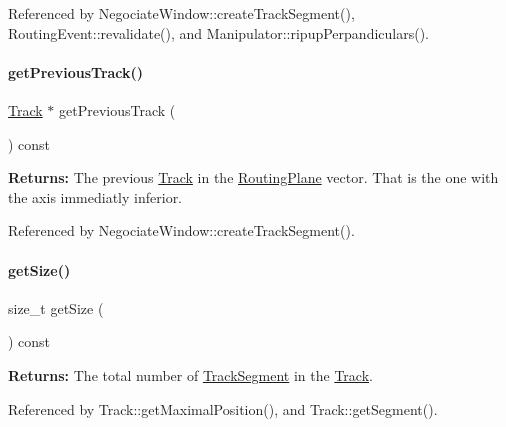 Referenced by Negociate\+Window\+::create\+Track\+Segment(), Routing\+Event\+::revalidate(), and Manipulator\+::ripup\+Perpandiculars().

\mbox{\label{classKite_1_1Track_a984171d836a7f61df95e74beeddcf6b5}} 
\paragraph{\texorpdfstring{get\+Previous\+Track()}{getPreviousTrack()}}
{\footnotesize\ttfamily \mbox{\hyperlink{classKite_1_1Track}{Track}} $\ast$ get\+Previous\+Track (\begin{DoxyParamCaption}{ }\end{DoxyParamCaption}) const}

{\bfseries Returns\+:} The previous \mbox{\hyperlink{classKite_1_1Track}{Track}} in the {\ttfamily \mbox{\hyperlink{classKite_1_1RoutingPlane}{Routing\+Plane}}} vector. That is the one with the axis immediatly inferior. 

Referenced by Negociate\+Window\+::create\+Track\+Segment().

\mbox{\label{classKite_1_1Track_a9be1e4285daa77fe397767c097fbdc66}} 
\paragraph{\texorpdfstring{get\+Size()}{getSize()}}
{\footnotesize\ttfamily size\+\_\+t get\+Size (\begin{DoxyParamCaption}{ }\end{DoxyParamCaption}) const\hspace{0.3cm}{\ttfamily [inline]}}

{\bfseries Returns\+:} The total number of \mbox{\hyperlink{classKite_1_1TrackSegment}{Track\+Segment}} in the \mbox{\hyperlink{classKite_1_1Track}{Track}}. 

Referenced by Track\+::get\+Maximal\+Position(), and Track\+::get\+Segment().

\mbox{\label{classKite_1_1Track_a2a033f90e528d3d07aa33694dd733200}} 
